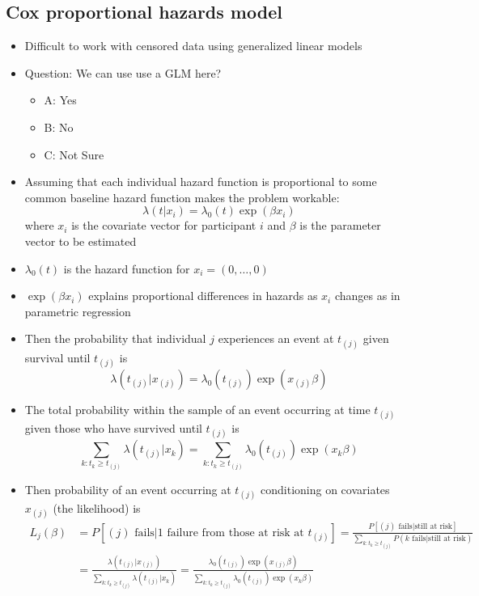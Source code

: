 \documentclass[
]{article}
\providecommand{\tightlist}{%
  \setlength{\itemsep}{0pt}\setlength{\parskip}{0pt}}
\begin{document}
\hypertarget{cox-proportional-hazards-model}{%
\subsection{Cox proportional hazards
model}\label{cox-proportional-hazards-model}}

\begin{itemize}
\item
  Difficult to work with censored data using generalized linear models
\item
  Question: We can use use a GLM here?

  \begin{itemize}
  \tightlist
  \item
    A: Yes
  \item
    B: No
  \item
    C: Not Sure
  \end{itemize}
\item
  Assuming that each individual hazard function is proportional to some
  common baseline hazard function makes the problem workable: \[
  \lambda(t|x_i) = \lambda_0(t) \exp(\beta x_i)
  \] where \(x_i\) is the covariate vector for participant \(i\) and
  \(\beta\) is the parameter vector to be estimated
\item
  \(\lambda_0(t)\) is the hazard function for \(x_i=(0,\dots,0)\)
\item
  \(\exp(\beta x_i)\) explains proportional differences in hazards as
  \(x_i\) changes as in parametric regression
\item
  Then the probability that individual \(j\) experiences an event at
  \(t_{(j)}\) given survival until \(t_{(j)}\) is
  \[\lambda(t_{(j)}|x_{(j)})=\lambda_0(t_{(j)})\exp(x_{(j)}\beta)\]
\item
  The total probability within the sample of an event occurring at time
  \(t_{(j)}\) given those who have survived until \(t_{(j)}\) is
  \[\sum_{k: t_k\geq t_{(j)}} \lambda(t_{(j)}|x_k) = \sum_{k: t_k\geq t_{(j)}} \lambda_0(t_{(j)})\exp(x_k\beta)\]
\item
  Then probability of an event occurring at \(t_{(j)}\) conditioning on
  covariates \(x_{(j)}\) (the likelihood) is \[\begin{align*}
  L_j(\beta) &= P[(j)\text{ fails}|\text{1 failure from those at risk at $t_{(j)}$}]
  = \frac{P[\text{$(j)$ fails}| \text{still at risk}]}{\sum_{k: t_k\geq t_{(j)}}P(\text{$k$ fails}| \text{still at risk})} \\
  &= \frac{\lambda(t_{(j)}|x_{(j)})}{\sum_{k: t_k\geq t_{(j)}} \lambda(t_{(j)}|x_k)} = \frac{\lambda_0(t_{(j)})\exp(x_{(j)}\beta)}{\sum_{k: t_k\geq t_{(j)}} \lambda_0(t_{(j)})\exp(x_k\beta)}

\end{align*}\]
\end{itemize}
\end{document}
